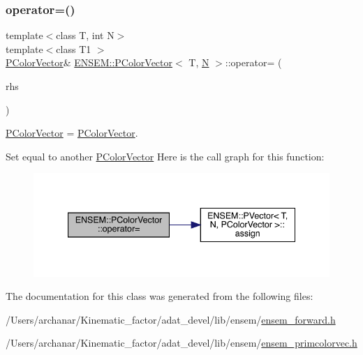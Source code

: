 \subsubsection{\texorpdfstring{operator=()}{operator=()}\hspace{0.1cm}{\footnotesize\ttfamily [2/2]}}
{\footnotesize\ttfamily template$<$class T, int N$>$ \\
template$<$class T1 $>$ \\
\mbox{\hyperlink{classENSEM_1_1PColorVector}{P\+Color\+Vector}}\& \mbox{\hyperlink{classENSEM_1_1PColorVector}{E\+N\+S\+E\+M\+::\+P\+Color\+Vector}}$<$ T, \mbox{\hyperlink{operator__name__util_8cc_a7722c8ecbb62d99aee7ce68b1752f337}{N}} $>$\+::operator= (\begin{DoxyParamCaption}\item[{const \mbox{\hyperlink{classENSEM_1_1PColorVector}{P\+Color\+Vector}}$<$ T1, \mbox{\hyperlink{operator__name__util_8cc_a7722c8ecbb62d99aee7ce68b1752f337}{N}} $>$ \&}]{rhs }\end{DoxyParamCaption})\hspace{0.3cm}{\ttfamily [inline]}}



\mbox{\hyperlink{classENSEM_1_1PColorVector}{P\+Color\+Vector}} = \mbox{\hyperlink{classENSEM_1_1PColorVector}{P\+Color\+Vector}}. 

Set equal to another \mbox{\hyperlink{classENSEM_1_1PColorVector}{P\+Color\+Vector}} Here is the call graph for this function\+:
\nopagebreak
\begin{figure}[H]
\begin{center}
\leavevmode
\includegraphics[width=340pt]{de/dfe/classENSEM_1_1PColorVector_ac5919a92dade0bb7763353ed7d05b8b2_cgraph}
\end{center}
\end{figure}


The documentation for this class was generated from the following files\+:\begin{DoxyCompactItemize}
\item 
/\+Users/archanar/\+Kinematic\+\_\+factor/adat\+\_\+devel/lib/ensem/\mbox{\hyperlink{lib_2ensem_2ensem__forward_8h}{ensem\+\_\+forward.\+h}}\item 
/\+Users/archanar/\+Kinematic\+\_\+factor/adat\+\_\+devel/lib/ensem/\mbox{\hyperlink{lib_2ensem_2ensem__primcolorvec_8h}{ensem\+\_\+primcolorvec.\+h}}\end{DoxyCompactItemize}
